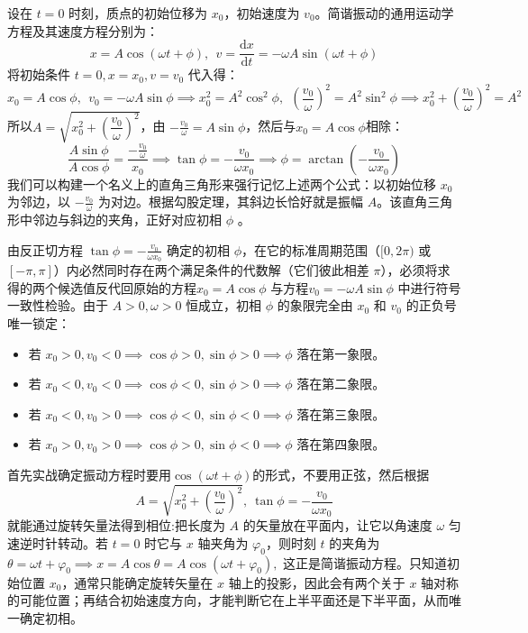 \documentclass[lang=cn,11pt]{elegantbook}
\begin{document}
\begin{theorem}[由初始条件确定简谐振动的振幅与初相]
    设在 $t = 0$ 时刻，质点的初始位移为 $x_0$，初始速度为 $v_0$。简谐振动的通用运动学方程及其速度方程分别为：$$x = A \cos(\omega t + \phi),~~v = \frac{\mathrm{d}x}{\mathrm{d}t} = -\omega A \sin(\omega t + \phi)$$将初始条件 $t = 0, x = x_0, v = v_0$ 代入得：$$x_0 = A \cos\phi ,~~v_0 = -\omega A \sin\phi \implies x_0^2 = A^2 \cos^2\phi,~~\left(\frac{v_0}{\omega}\right)^2 = A^2 \sin^2\phi\implies x_0^2 + \left(\frac{v_0}{\omega}\right)^2 = A^2$$所以$A = \sqrt{x_0^2 + \left(\dfrac{v_0}{\omega}\right)^2} $，由 $- \frac{v_0}{\omega} = A \sin\phi$，然后与$x_0 = A \cos\phi$相除：$$\frac{A \sin\phi}{A \cos\phi} = \frac{-\frac{v_0}{\omega}}{x_0} \implies \tan\phi = -\frac{v_0}{\omega x_0}\implies\boxed{\phi = \arctan\left(-\frac{v_0}{\omega x_0}\right)} $$我们可以构建一个名义上的直角三角形来强行记忆上述两个公式：以初始位移 $x_0$ 为邻边，以 $-\frac{v_0}{\omega}$ 为对边。根据勾股定理，其斜边长恰好就是振幅 $A$。该直角三角形中邻边与斜边的夹角，正好对应初相 $\phi$ 。
    
    由反正切方程 $\tan\phi = -\frac{v_0}{\omega x_0}$ 确定的初相 $\phi$，在它的标准周期范围（$[0, 2\pi)$ 或 $[-\pi, \pi]$）内必然同时存在两个满足条件的代数解（它们彼此相差 $\pi$），必须将求得的两个候选值反代回原始的方程$x_0 = A \cos\phi$ 与方程$v_0 = -\omega A \sin\phi$ 中进行符号一致性检验。由于 $A > 0, \omega > 0$ 恒成立，初相 $\phi$ 的象限完全由 $x_0$ 和 $v_0$ 的正负号唯一锁定：
    \begin{itemize}
    \item 若 $x_0 > 0, v_0 < 0 \implies \cos\phi > 0, \sin\phi > 0 \implies \phi$ 落在第一象限。
    \item 若 $x_0 < 0, v_0 < 0 \implies \cos\phi < 0, \sin\phi > 0 \implies \phi$ 落在第二象限。
    \item 若 $x_0 < 0, v_0 > 0 \implies \cos\phi < 0, \sin\phi < 0 \implies \phi$ 落在第三象限。
    \item 若 $x_0 > 0, v_0 > 0 \implies \cos\phi > 0, \sin\phi < 0 \implies \phi$ 落在第四象限。
    \end{itemize}
\end{theorem}

\begin{definition}[旋转矢量法]
首先实战确定振动方程时要用$\cos(\omega t+\phi)$的形式，不要用正弦，然后根据\[A = \sqrt{x_0^2 + \left(\dfrac{v_0}{\omega}\right)^2},~\tan\phi = -\frac{v_0}{\omega x_0}\]就能通过旋转矢量法得到相位:把长度为 \(A\) 的矢量放在平面内，让它以角速度 \(\omega\) 匀速逆时针转动。若 \(t=0\) 时它与 \(x\) 轴夹角为 \(\varphi_0\)，则时刻 \(t\) 的夹角为
 \(\theta=\omega t+\varphi_0 \implies x=A\cos\theta=A\cos(\omega t+\varphi_0),\) 
这正是简谐振动方程。只知道初始位置 \(x_0\)，通常只能确定旋转矢量在 \(x\) 轴上的投影，因此会有两个关于 \(x\) 轴对称的可能位置；再结合初始速度方向，才能判断它在上半平面还是下半平面，从而唯一确定初相。
\end{definition}
\end{document}
